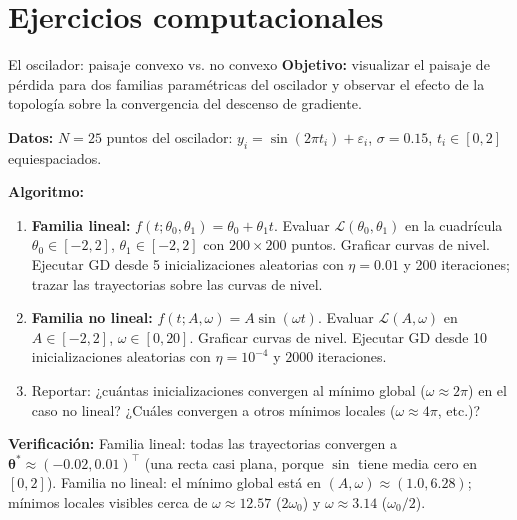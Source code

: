 \section*{Ejercicios computacionales}

\begin{ejerciciocomp}{El oscilador: paisaje convexo vs. no convexo}
\label{ejcomp:oscilador3}
\textbf{Objetivo:} visualizar el paisaje de pérdida para dos familias
paramétricas del oscilador y observar el efecto de la topología sobre
la convergencia del descenso de gradiente.

\medskip\noindent\textbf{Datos:}
$N = 25$ puntos del oscilador: $y_i = \sin(2\pi t_i) + \varepsilon_i$,
$\sigma = 0.15$, $t_i \in [0, 2]$ equiespaciados.

\medskip\noindent\textbf{Algoritmo:}
\begin{enumerate}
  \item \textbf{Familia lineal:} $f(t;\theta_0,\theta_1) = \theta_0 +
        \theta_1 t$. Evaluar $\mathcal{L}(\theta_0,\theta_1)$ en la
        cuadrícula $\theta_0 \in [-2,2]$, $\theta_1 \in [-2,2]$ con
        $200 \times 200$ puntos. Graficar curvas de nivel. Ejecutar GD
        desde 5 inicializaciones aleatorias con $\eta = 0.01$ y 200
        iteraciones; trazar las trayectorias sobre las curvas de nivel.
  \item \textbf{Familia no lineal:} $f(t;A,\omega) = A\sin(\omega t)$.
        Evaluar $\mathcal{L}(A,\omega)$ en $A \in [-2,2]$,
        $\omega \in [0, 20]$. Graficar curvas de nivel. Ejecutar GD
        desde 10 inicializaciones aleatorias con $\eta = 10^{-4}$ y
        $2000$ iteraciones.
  \item Reportar: ¿cuántas inicializaciones convergen al mínimo global
        ($\omega \approx 2\pi$) en el caso no lineal? ¿Cuáles convergen
        a otros mínimos locales ($\omega \approx 4\pi$, etc.)?
\end{enumerate}

\medskip\noindent\textbf{Verificación:}
Familia lineal: todas las trayectorias convergen a
$\bm{\theta}^* \approx (-0.02, 0.01)^\top$ (una recta casi plana,
porque $\sin$ tiene media cero en $[0,2]$).
Familia no lineal: el mínimo global está en $(A,\omega) \approx (1.0,
6.28)$; mínimos locales visibles cerca de $\omega \approx 12.57$
($2\omega_0$) y $\omega \approx 3.14$ ($\omega_0/2$).
\end{ejerciciocomp}

